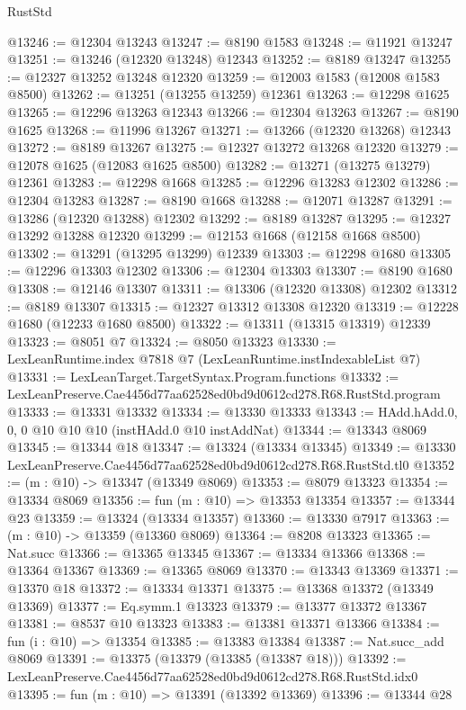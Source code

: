 \begin{lexlean}{RustStd}
\begin{coremodule}
@13246 := @12304 @13243
@13247 := @8190 @1583
@13248 := @11921 @13247
@13251 := @13246 (@12320 @13248) @12343
@13252 := @8189 @13247
@13255 := @12327 @13252 @13248 @12320
@13259 := @12003 @1583 (@12008 @1583 @8500)
@13262 := @13251 (@13255 @13259) @12361
@13263 := @12298 @1625
@13265 := @12296 @13263 @12343
@13266 := @12304 @13263
@13267 := @8190 @1625
@13268 := @11996 @13267
@13271 := @13266 (@12320 @13268) @12343
@13272 := @8189 @13267
@13275 := @12327 @13272 @13268 @12320
@13279 := @12078 @1625 (@12083 @1625 @8500)
@13282 := @13271 (@13275 @13279) @12361
@13283 := @12298 @1668
@13285 := @12296 @13283 @12302
@13286 := @12304 @13283
@13287 := @8190 @1668
@13288 := @12071 @13287
@13291 := @13286 (@12320 @13288) @12302
@13292 := @8189 @13287
@13295 := @12327 @13292 @13288 @12320
@13299 := @12153 @1668 (@12158 @1668 @8500)
@13302 := @13291 (@13295 @13299) @12339
@13303 := @12298 @1680
@13305 := @12296 @13303 @12302
@13306 := @12304 @13303
@13307 := @8190 @1680
@13308 := @12146 @13307
@13311 := @13306 (@12320 @13308) @12302
@13312 := @8189 @13307
@13315 := @12327 @13312 @13308 @12320
@13319 := @12228 @1680 (@12233 @1680 @8500)
@13322 := @13311 (@13315 @13319) @12339
@13323 := @8051 @7
@13324 := @8050 @13323
@13330 := LexLeanRuntime.index @7818 @7 (LexLeanRuntime.instIndexableList @7)
@13331 := LexLeanTarget.TargetSyntax.Program.functions
@13332 := LexLeanPreserve.Cae4456d77aa62528ed0bd9d0612cd278.R68.RustStd.program
@13333 := @13331 @13332
@13334 := @13330 @13333
@13343 := HAdd.hAdd.{0, 0, 0} @10 @10 @10 (instHAdd.{0} @10 instAddNat)
@13344 := @13343 @8069
@13345 := @13344 @18
@13347 := @13324 (@13334 @13345)
@13349 := @13330 LexLeanPreserve.Cae4456d77aa62528ed0bd9d0612cd278.R68.RustStd.tl0
@13352 := (m : @10) -> @13347 (@13349 @8069)
@13353 := @8079 @13323
@13354 := @13334 @8069
@13356 := fun (m : @10) => @13353 @13354
@13357 := @13344 @23
@13359 := @13324 (@13334 @13357)
@13360 := @13330 @7917
@13363 := (m : @10) -> @13359 (@13360 @8069)
@13364 := @8208 @13323
@13365 := Nat.succ
@13366 := @13365 @13345
@13367 := @13334 @13366
@13368 := @13364 @13367
@13369 := @13365 @8069
@13370 := @13343 @13369
@13371 := @13370 @18
@13372 := @13334 @13371
@13375 := @13368 @13372 (@13349 @13369)
@13377 := Eq.symm.{1} @13323
@13379 := @13377 @13372 @13367
@13381 := @8537 @10 @13323
@13383 := @13381 @13371 @13366
@13384 := fun (i : @10) => @13354
@13385 := @13383 @13384
@13387 := Nat.succ_add @8069
@13391 := @13375 (@13379 (@13385 (@13387 @18)))
@13392 := LexLeanPreserve.Cae4456d77aa62528ed0bd9d0612cd278.R68.RustStd.idx0
@13395 := fun (m : @10) => @13391 (@13392 @13369)
@13396 := @13344 @28

\end{coremodule}
\end{lexlean}
